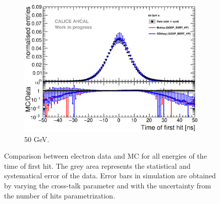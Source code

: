 \documentclass{JINST}
\begin{document}
\begin{figure}[htbp!]
\begin{subfigure}[t]{0.49\textwidth}
    \includegraphics[width=1\textwidth]{fig/Comparison_SimData_Electrons50GeV.eps}
    \caption{50 GeV.}\label{fig:elec_sim_data_50GeV}
  \end{subfigure}
  \caption{Comparison between electron data and MC for all energies of the time of first hit. The grey area represents the statistical and systematical error of the data. Error bars in simulation are obtained by varying the cross-talk parameter and with the uncertainty from the number of hits parametrization.} \label{fig:sim_data_elec_add}
\end{figure}
\end{document}
